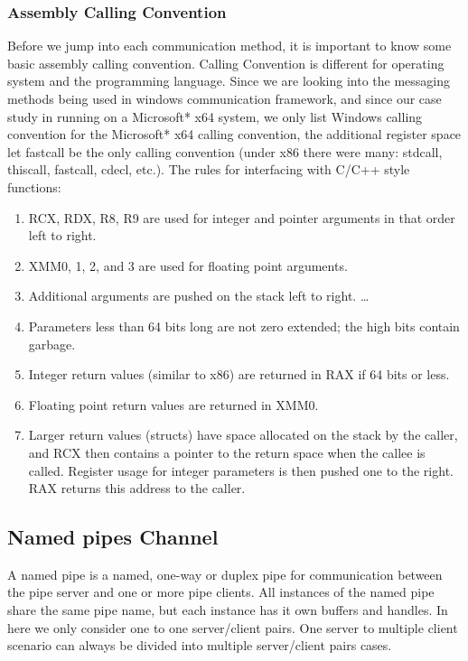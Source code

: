 \documentclass[paper=a4, fontsize=11pt]{scrartcl}
\numberwithin{equation}{section}		%
\numberwithin{figure}{section}			%
\numberwithin{table}{section}				%
\begin{document}
\subsubsection{Assembly Calling Convention}
Before we jump into each communication method, it is important to know some basic assembly calling convention.
Calling Convention is different for operating system and the programming language. Since we are looking into the messaging methods being used in windows communication framework, and since our case study in running on a Microsoft* x64 system, we only list Windows calling convention for the Microsoft* x64 calling convention, the additional register space let fastcall be the only calling convention (under x86 there were many: stdcall, thiscall, fastcall, cdecl, etc.). The rules for interfacing with C/C++ style functions:\par
\begin{enumerate}  
\item RCX, RDX, R8, R9 are used for integer and pointer arguments in that order left to right.
\item XMM0, 1, 2, and 3 are used for floating point arguments.
\item Additional arguments are pushed on the stack left to right. \ldots 
\item Parameters less than 64 bits long are not zero extended; the high bits contain garbage.
\item Integer return values (similar to x86) are returned in RAX if 64 bits or less.
\item Floating point return values are returned in XMM0.
\item Larger return values (structs) have space allocated on the stack by the caller, and RCX then contains a pointer to the return space when the callee is called. Register usage for integer parameters is then pushed one to the right. RAX returns this address to the caller.
\end{enumerate}

\subsection{Named pipes Channel}
A named pipe is a named, one-way or duplex pipe for communication between the pipe server and one or more pipe clients. All instances of the named pipe share the same pipe name, but each instance has it own buffers and handles. In here we only consider one to one server/client pairs. One server to multiple client scenario can always be divided into multiple server/client pairs cases.
\end{document}

